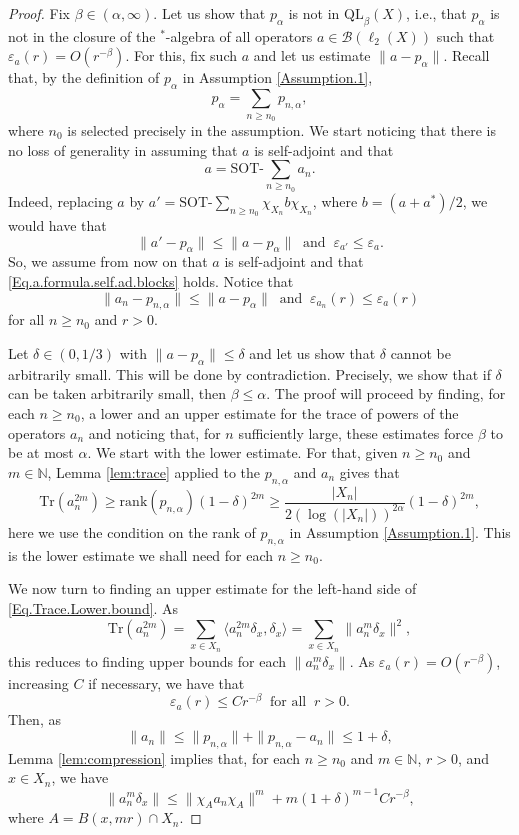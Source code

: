 \documentclass[11pt]{amsart}
\newcommand{\N}{\mathbb{N}}
\newcommand{\cB}{\mathcal{B}}
\newcommand{\eps}{\varepsilon}
\newcommand{\SOTh}{\mathrm{SOT}\text{-}}
\numberwithin{equation}{section}
\theoremstyle{definition}
\theoremstyle{remark}
\begin{document}
\begin{proof}
    Fix $\beta\in (\alpha,\infty)$. Let us show that $p_\alpha$ is not in $\mathrm{QL}_{\beta}(X)$, i.e., that $p_\alpha$ is not in the closure of the $^*$-algebra of all operators $a\in \cB(\ell_2(X))$ such that $\eps_a(r)= O(r^{-\beta})$. For this, fix such $a$    and let us estimate $\|a-p_\alpha\|$. Recall that, by the definition of $p_\alpha$ in Assumption \ref{Assumption.1}, 
    \[p_\alpha=\sum_{n\geq n_0}p_{n,\alpha},\]
    where $n_0$ is selected precisely in the assumption. 
     We start   noticing that there is no loss of generality in assuming that $a$ is self-adjoint and that \begin{equation}\label{Eq.a.formula.self.ad.blocks}
    a=\SOTh\sum_{n\geq n_0}a_n.\end{equation}
    Indeed, replacing $a$ by $a'=\SOTh\sum_{n\geq n_0}\chi_{X_n}b\chi_{X_n}$, where $b=(a+a^*)/2$, we would  have that \[\|a'-p_\alpha\|\leq \|a-p_\alpha\| \ \text{ and }\ \eps_{a'}\leq \eps_a.\] So, we assume from now on that $a$ is self-adjoint and that \eqref{Eq.a.formula.self.ad.blocks} holds. Notice that
    \[\|a_n-p_{n,\alpha}\|\leq \|a-p_\alpha\| \ \text{ and }\ \eps_{a_n}(r)\leq \eps_a(r)\]
for all $n\geq n_0$ and $r>0$.

    Let $\delta\in(0,1/3)$ with $\|a-p_\alpha\|\leq\delta$ and let us show that $\delta$ cannot be arbitrarily small. This will be done by contradiction. Precisely, we show that if $\delta$ can be taken arbitrarily small, then $\beta\leq \alpha$.  The proof will proceed by finding, for each $n\geq n_0$, a lower and an upper estimate for the trace of powers of the operators $a_n$ and noticing that, for $n$ sufficiently large, these estimates force $\beta$ to be at most $\alpha$.  We start with the lower estimate. For that, given $n\geq n_0$ and  $m\in\N$, Lemma \ref{lem:trace} applied to the   $p_{n,\alpha}$ and $a_n$ gives that
    \begin{equation}\label{Eq.Trace.Lower.bound}\mathrm{Tr}\left(a_n^{2m}\right)\geq \mathrm{rank}(p_{n,\alpha})(1-\delta)^{2m}\geq \frac{|X_n|}{2(\log(|X_n|))^ {2\alpha}}(1-\delta)^{2m},\end{equation}
    here we use the condition on the rank of $p_{n,\alpha}$ in Assumption \ref{Assumption.1}. This is the lower estimate we shall need for each $n\geq n_0$.

We now turn to finding an upper estimate for the left-hand side of \eqref{Eq.Trace.Lower.bound}. As
    \[\mathrm{Tr}(a_n^{2m})=\sum_{x\in X_n}\langle a_n^{2m}\delta_x,\delta_x\rangle=\sum_{x\in X_n}\|a_n^m\delta_x\|^2,\]
this reduces to finding upper bounds for each   $\|a_n^m\delta_x\|$. As $\eps_a(r)= O(r^{-\beta})$,   increasing $C$ if necessary, we have that  \[\eps_a(r)\leq Cr^{-\beta} \ \text{ for all }\ r>0.\]
Then, as  \[\|a_n\|\leq \|p_{n,\alpha}\|+\|p_{n,\alpha}-a_n\|\leq 1+\delta,\]  Lemma \ref{lem:compression}
implies that, for each $n\geq n_0$ and $m\in\N$, $r>0$, and $x\in X_n$, we have
\begin{equation}\label{Eq.qweqweqwe}\|a^m_n\delta_x\|\leq\|\chi_Aa_n\chi_A\|^m+m(1+\delta)^{m-1}Cr^{-\beta},\end{equation}
where $A=B(x,mr)\cap X_n$.


\end{proof}
\end{document}
